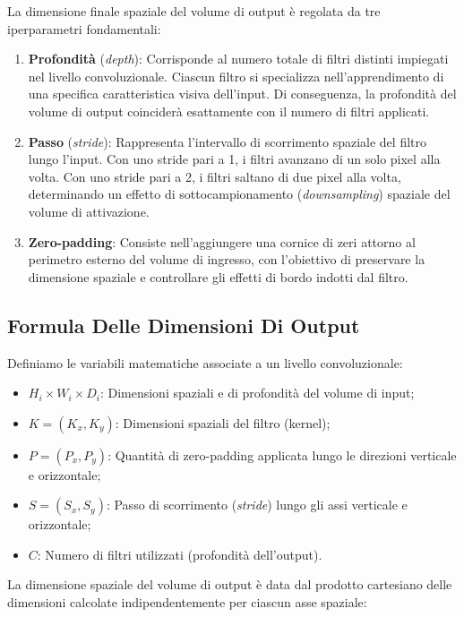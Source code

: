 ﻿\documentclass[11pt, a4paper]{article}
\begin{document}
La dimensione finale spaziale del volume di output è regolata da tre iperparametri fondamentali:
\begin{enumerate}
    \item \textbf{Profondità} (\emph{depth}): Corrisponde al numero totale di filtri distinti impiegati nel livello convoluzionale. Ciascun filtro si specializza nell'apprendimento di una specifica caratteristica visiva dell'input. Di conseguenza, la profondità del volume di output coinciderà esattamente con il numero di filtri applicati.
    \item \textbf{Passo} (\emph{stride}): Rappresenta l'intervallo di scorrimento spaziale del filtro lungo l'input. Con uno stride pari a 1, i filtri avanzano di un solo pixel alla volta. Con uno stride pari a 2, i filtri saltano di due pixel alla volta, determinando un effetto di sottocampionamento (\emph{downsampling}) spaziale del volume di attivazione.
    \item \textbf{Zero-padding}: Consiste nell'aggiungere una cornice di zeri attorno al perimetro esterno del volume di ingresso, con l'obiettivo di preservare la dimensione spaziale e controllare gli effetti di bordo indotti dal filtro.
\end{enumerate}

\subsection{Formula Delle Dimensioni Di Output}

Definiamo le variabili matematiche associate a un livello convoluzionale:
\begin{itemize}
    \item $H_i \times W_i \times D_i$: Dimensioni spaziali e di profondità del volume di input;
    \item $K = (K_x, K_y)$: Dimensioni spaziali del filtro (kernel);
    \item $P = (P_x, P_y)$: Quantità di zero-padding applicata lungo le direzioni verticale e orizzontale;
    \item $S = (S_x, S_y)$: Passo di scorrimento (\emph{stride}) lungo gli assi verticale e orizzontale;
    \item $C$: Numero di filtri utilizzati (profondità dell'output).
\end{itemize}

La dimensione spaziale del volume di output è data dal prodotto cartesiano delle dimensioni calcolate indipendentemente per ciascun asse spaziale:
\end{document}
